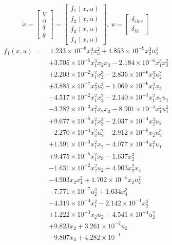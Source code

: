 \documentclass[%
 reprint,
 amsmath,amssymb,
 aps,
]{revtex4-2}
\begin{document}
$$ \dot{x} = \begin{bmatrix} V \\ \alpha \\ q \\ \theta \end{bmatrix} = \begin{bmatrix} f_1(x,u) \\ f_2(x,u) \\ f_3(x,u) \\ f_4(x,u) \end{bmatrix},\ u = \begin{bmatrix} \delta_{elev} \\ \delta_{th} \end{bmatrix} $$ 
\begin{align*}
f_1(x,u) = \
&\ 1.233\times10^{-8}x_1^4x_3^2 + 4.853\times10^{-9}x_2^3u_2^3 \\
&+ 3.705\times10^{-5}x_1^3x_2 x_3 
- 2.184\times10^{-6}x_1^3x_3^2 \\
&+ 2.203\times10^{-2}x_1^2x_2^3 - 2.836\times10^{-6}x_2^3u_2^2 \\
& + 3.885\times10^{-7}x_2^2u_2^3 - 1.069\times10^{-6}x_1^3x_3 \\
& - 4.517\times10^{-2}x_1^2x_2^2
- 2.140\times10^{-3}x_1^2x_2u_1 \\
&- 3.282\times10^{-3}x_1^2x_2 x_3 - 8.901\times10^{-4}x_1^2u_1^2 \\
& + 9.677\times10^{-5}x_1^2x_3^2 - 2.037\times10^{-4}x_2^3u_2 \\
&- 2.270\times10^{-4}x_2^2u_2^2
- 2.912\times10^{-8}x_2u_2^3 \\
&+ 1.591\times10^{-3}x_1^2x_2 - 4.077\times10^{-4}x_1^2u_1 \\
& + 9.475\times10^{-5}x_1^2x_3 - 1.637x_2^3 \\
&- 1.631\times10^{-2}x_2^2u_2 + 4.903x_2^2x_4 \\
& -4.903x_2x_4^2 + 1.702\times10^{-5}x_2u_2^2 \\
&- 7.771\times10^{-7}u_2^3 + 1.634x_4^3  \\
&- 4.319\times10^{-4}x_1^2 - 2.142\times10^{-1}x_2^2 \\
&+ 1.222\times10^{-3}x_2u_2
+ 4.541\times10^{-4}u_2^2 \\
&+ 9.823x_2 + 3.261\times10^{-2}u_2 \\
&- 9.807x_4 + 4.282\times10^{-1}
\tag{24}
\end{align*}
\end{document}
